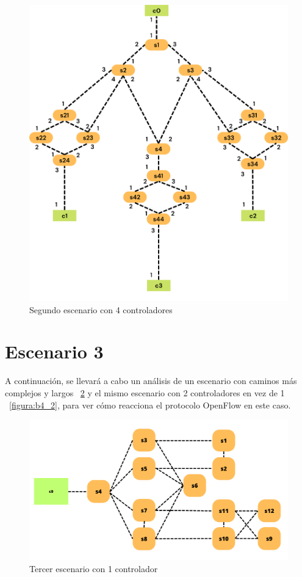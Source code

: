 \documentclass[a4paper, 12pt]{book}
\begin{document}
 	\begin{figure}[H]
 		\centering
 		\includegraphics[width=16cm, keepaspectratio]{img/escenario2-2}
 		\caption{Segundo escenario con 4 controladores}
 		\label{figura:escenario2-4c}
 	\end{figure}
 	
 	\section{Escenario 3}
 	
 	A continuación, se llevará a cabo un análisis de un escenario con caminos más complejos y largos ~\ref{figura:b4_1} y el mismo escenario con 2 controladores en vez de 1 ~\ref{figura:b4_2}, para ver cómo reacciona el protocolo OpenFlow en este caso.
 	
 	\begin{figure}[H]
 		\centering
 		\includegraphics[width=16cm, keepaspectratio]{img/b4_1}
 		\caption{Tercer escenario con 1 controlador}
 		\label{figura:b4_1}
 	\end{figure}
 	
\end{document}
